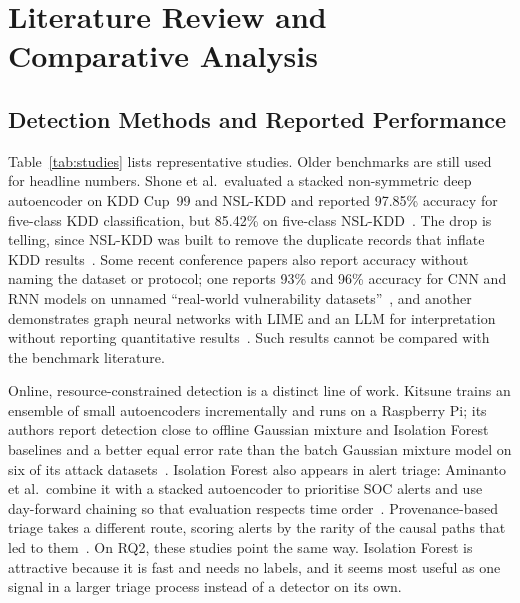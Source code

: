\documentclass[conference]{IEEEtran}
\begin{document}
\section{Literature Review and Comparative Analysis}
\subsection{Detection Methods and Reported Performance}
Table~\ref{tab:studies} lists representative studies. Older benchmarks are still used for headline numbers. Shone et al.\ evaluated a stacked non-symmetric deep autoencoder on KDD Cup~99 and NSL-KDD and reported 97.85\% accuracy for five-class KDD classification, but 85.42\% on five-class NSL-KDD~\cite{shone2018deep}. The drop is telling, since NSL-KDD was built to remove the duplicate records that inflate KDD results~\cite{tavallaee2009detailed}. Some recent conference papers also report accuracy without naming the dataset or protocol; one reports 93\% and 96\% accuracy for CNN and RNN models on unnamed ``real-world vulnerability datasets''~\cite{rajendran2024cybersecurity}, and another demonstrates graph neural networks with LIME and an LLM for interpretation without reporting quantitative results~\cite{balaji2025explainable}. Such results cannot be compared with the benchmark literature.

Online, resource-constrained detection is a distinct line of work. Kitsune trains an ensemble of small autoencoders incrementally and runs on a Raspberry Pi; its authors report detection close to offline Gaussian mixture and Isolation Forest baselines and a better equal error rate than the batch Gaussian mixture model on six of its attack datasets~\cite{mirsky2018kitsune}. Isolation Forest also appears in alert triage: Aminanto et al.\ combine it with a stacked autoencoder to prioritise SOC alerts and use day-forward chaining so that evaluation respects time order~\cite{aminanto2020threat}. Provenance-based triage takes a different route, scoring alerts by the rarity of the causal paths that led to them~\cite{hassan2019nodoze}. On RQ2, these studies point the same way. Isolation Forest is attractive because it is fast and needs no labels, and it seems most useful as one signal in a larger triage process instead of a detector on its own.
\end{document}
